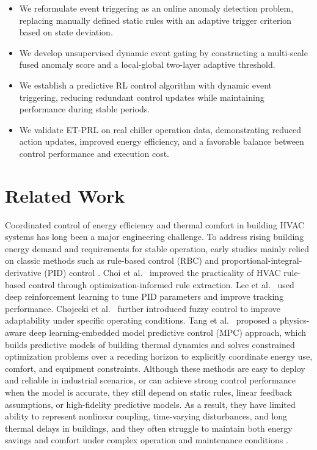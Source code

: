 ﻿\documentclass[preprint,12pt,number]{elsarticle}
\begin{document}
\begin{itemize}
\item
  We reformulate event triggering as an online anomaly detection problem, replacing manually defined static rules with an adaptive trigger criterion based on state deviation.
\item
  We develop unsupervised dynamic event gating by constructing a multi-scale fused anomaly score and a local-global two-layer adaptive threshold.
\item
  We establish a predictive RL control algorithm with dynamic event triggering, reducing redundant control updates while maintaining performance during stable periods.
\item
  We validate ET-PRL on real chiller operation data, demonstrating reduced action updates, improved energy efficiency, and a favorable balance between control performance and execution cost.
\end{itemize}

\section{Related Work}\label{related-work}

Coordinated control of energy efficiency and thermal comfort in building HVAC systems has long been a major engineering challenge. To address rising building energy demand and requirements for stable operation, early studies mainly relied on classic methods such as rule-based control (RBC) and proportional-integral-derivative (PID) control \cite{ref12}. Choi et al.~\cite{ref13} improved the practicality of HVAC rule-based control through optimization-informed rule extraction. Lee et al.~\cite{ref14} used deep reinforcement learning to tune PID parameters and improve tracking performance. Chojecki et al.~\cite{ref15} further introduced fuzzy control to improve adaptability under specific operating conditions. Tang et al.~\cite{ref16} proposed a physics-aware deep learning-embedded model predictive control (MPC) approach, which builds predictive models of building thermal dynamics and solves constrained optimization problems over a receding horizon to explicitly coordinate energy use, comfort, and equipment constraints. Although these methods are easy to deploy and reliable in industrial scenarios, or can achieve strong control performance when the model is accurate, they still depend on static rules, linear feedback assumptions, or high-fidelity predictive models. As a result, they have limited ability to represent nonlinear coupling, time-varying disturbances, and long thermal delays in buildings, and they often struggle to maintain both energy savings and comfort under complex operation and maintenance conditions \cite{ref17}.
\end{document}
